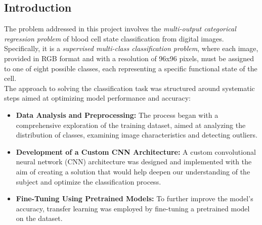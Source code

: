 \documentclass[11pt]{article}
\begin{document}
    \begin{multicols}{2}
        \section{Introduction}
        The problem addressed in this project involves the \textit{multi-output categorical regression problem} of blood cell state classification from digital images. Specifically, it is a \textit{supervised multi-class classification problem}, where each image, provided in RGB format and with a resolution of 96x96 pixels, must be assigned to one of eight possible classes, each representing a specific functional state of the cell.\\ 
        The approach to solving the classification task was structured around systematic steps aimed at optimizing model performance and accuracy:
        \begin{itemize}
            \item \textbf{Data Analysis and Preprocessing:}
                The process began with a comprehensive exploration of the training dataset, aimed at analyzing the distribution of classes, examining image characteristics and detecting outliers.
            \item \textbf{Development of a Custom CNN Architecture:}
                A custom convolutional neural network (CNN) architecture was designed and implemented with the aim of creating a solution that would help deepen our understanding of the subject and optimize the classification process.
            \item \textbf{Fine-Tuning Using Pretrained Models:}
                To further improve the model's accuracy, transfer learning was employed by fine-tuning a pretrained model on the dataset.
        \end{itemize}
        

\end{multicols}
\end{document}
